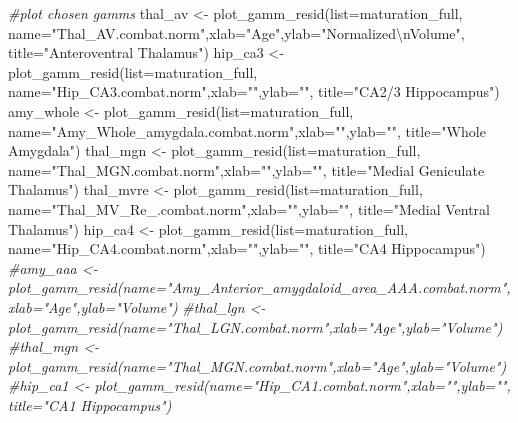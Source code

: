 \documentclass[
]{article}
\newenvironment{Shaded}{\begin{snugshade}}{\end{snugshade}}
\newcommand{\AttributeTok}[1]{\textcolor[rgb]{0.77,0.63,0.00}{#1}}
\newcommand{\CommentTok}[1]{\textcolor[rgb]{0.56,0.35,0.01}{\textit{#1}}}
\newcommand{\FunctionTok}[1]{\textcolor[rgb]{0.00,0.00,0.00}{#1}}
\newcommand{\NormalTok}[1]{#1}
\newcommand{\OtherTok}[1]{\textcolor[rgb]{0.56,0.35,0.01}{#1}}
\newcommand{\SpecialCharTok}[1]{\textcolor[rgb]{0.00,0.00,0.00}{#1}}
\newcommand{\StringTok}[1]{\textcolor[rgb]{0.31,0.60,0.02}{#1}}
\begin{document}
\begin{Shaded}
\begin{Highlighting}[]
\CommentTok{\#plot chosen gamms}
\NormalTok{thal\_av }\OtherTok{\textless{}{-}} \FunctionTok{plot\_gamm\_resid}\NormalTok{(}\AttributeTok{list=}\NormalTok{maturation\_full, }\AttributeTok{name=}\StringTok{"Thal\_AV.combat.norm"}\NormalTok{,}\AttributeTok{xlab=}\StringTok{"Age"}\NormalTok{,}\AttributeTok{ylab=}\StringTok{"Normalized}\SpecialCharTok{\textbackslash{}n}\StringTok{Volume"}\NormalTok{, }\AttributeTok{title=}\StringTok{"Anteroventral Thalamus"}\NormalTok{)}
\NormalTok{hip\_ca3 }\OtherTok{\textless{}{-}} \FunctionTok{plot\_gamm\_resid}\NormalTok{(}\AttributeTok{list=}\NormalTok{maturation\_full, }\AttributeTok{name=}\StringTok{"Hip\_CA3.combat.norm"}\NormalTok{,}\AttributeTok{xlab=}\StringTok{""}\NormalTok{,}\AttributeTok{ylab=}\StringTok{""}\NormalTok{, }\AttributeTok{title=}\StringTok{"CA2/3 Hippocampus"}\NormalTok{)}
\NormalTok{amy\_whole }\OtherTok{\textless{}{-}} \FunctionTok{plot\_gamm\_resid}\NormalTok{(}\AttributeTok{list=}\NormalTok{maturation\_full, }\AttributeTok{name=}\StringTok{"Amy\_Whole\_amygdala.combat.norm"}\NormalTok{,}\AttributeTok{xlab=}\StringTok{""}\NormalTok{,}\AttributeTok{ylab=}\StringTok{""}\NormalTok{, }\AttributeTok{title=}\StringTok{"Whole Amygdala"}\NormalTok{)}
\NormalTok{thal\_mgn }\OtherTok{\textless{}{-}} \FunctionTok{plot\_gamm\_resid}\NormalTok{(}\AttributeTok{list=}\NormalTok{maturation\_full, }\AttributeTok{name=}\StringTok{"Thal\_MGN.combat.norm"}\NormalTok{,}\AttributeTok{xlab=}\StringTok{""}\NormalTok{,}\AttributeTok{ylab=}\StringTok{""}\NormalTok{, }\AttributeTok{title=}\StringTok{"Medial Geniculate Thalamus"}\NormalTok{)}
\NormalTok{thal\_mvre }\OtherTok{\textless{}{-}} \FunctionTok{plot\_gamm\_resid}\NormalTok{(}\AttributeTok{list=}\NormalTok{maturation\_full, }\AttributeTok{name=}\StringTok{"Thal\_MV\_Re\_.combat.norm"}\NormalTok{,}\AttributeTok{xlab=}\StringTok{""}\NormalTok{,}\AttributeTok{ylab=}\StringTok{""}\NormalTok{, }\AttributeTok{title=}\StringTok{"Medial Ventral Thalamus"}\NormalTok{)}
\NormalTok{hip\_ca4 }\OtherTok{\textless{}{-}} \FunctionTok{plot\_gamm\_resid}\NormalTok{(}\AttributeTok{list=}\NormalTok{maturation\_full, }\AttributeTok{name=}\StringTok{"Hip\_CA4.combat.norm"}\NormalTok{,}\AttributeTok{xlab=}\StringTok{""}\NormalTok{,}\AttributeTok{ylab=}\StringTok{""}\NormalTok{, }\AttributeTok{title=}\StringTok{"CA4 Hippocampus"}\NormalTok{)}
\CommentTok{\#amy\_aaa \textless{}{-} plot\_gamm\_resid(name="Amy\_Anterior\_amygdaloid\_area\_AAA.combat.norm",xlab="Age",ylab="Volume")}
\CommentTok{\#thal\_lgn \textless{}{-} plot\_gamm\_resid(name="Thal\_LGN.combat.norm",xlab="Age",ylab="Volume")}
\CommentTok{\#thal\_mgn \textless{}{-} plot\_gamm\_resid(name="Thal\_MGN.combat.norm",xlab="Age",ylab="Volume")}
\CommentTok{\#hip\_ca1 \textless{}{-} plot\_gamm\_resid(name="Hip\_CA1.combat.norm",xlab="",ylab="", title="CA1 Hippocampus")}



\end{Highlighting}
\end{Shaded}
\end{document}
